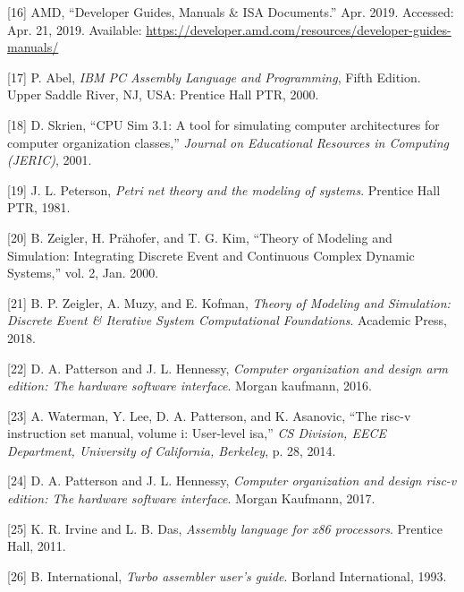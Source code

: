 \documentclass[12pt,twoside]{templates/unerthesis}
\newenvironment{cslreferences}%
  {}%
  {\par}
\begin{document}
\begin{cslreferences}
\leavevmode\hypertarget{ref-amd_developer_2019}{}%
{[}16{]} AMD, ``Developer Guides, Manuals \& ISA Documents.'' Apr. 2019. Accessed: Apr. 21, 2019. Available: \url{https://developer.amd.com/resources/developer-guides-manuals/}

\leavevmode\hypertarget{ref-abel_ibm_2000}{}%
{[}17{]} P. Abel, \emph{IBM PC Assembly Language and Programming}, Fifth Edition. Upper Saddle River, NJ, USA: Prentice Hall PTR, 2000.

\leavevmode\hypertarget{ref-skrien_cpu_2001}{}%
{[}18{]} D. Skrien, ``CPU Sim 3.1: A tool for simulating computer architectures for computer organization classes,'' \emph{Journal on Educational Resources in Computing (JERIC)}, 2001.

\leavevmode\hypertarget{ref-peterson_petri_1981}{}%
{[}19{]} J. L. Peterson, \emph{Petri net theory and the modeling of systems}. Prentice Hall PTR, 1981.

\leavevmode\hypertarget{ref-zeigler_theory_2000}{}%
{[}20{]} B. Zeigler, H. Prähofer, and T. G. Kim, ``Theory of Modeling and Simulation: Integrating Discrete Event and Continuous Complex Dynamic Systems,'' vol. 2, Jan. 2000.

\leavevmode\hypertarget{ref-zeigler_theory_2018}{}%
{[}21{]} B. P. Zeigler, A. Muzy, and E. Kofman, \emph{Theory of Modeling and Simulation: Discrete Event \& Iterative System Computational Foundations}. Academic Press, 2018.

\leavevmode\hypertarget{ref-patterson2016computer}{}%
{[}22{]} D. A. Patterson and J. L. Hennessy, \emph{Computer organization and design arm edition: The hardware software interface}. Morgan kaufmann, 2016.

\leavevmode\hypertarget{ref-waterman2014risc}{}%
{[}23{]} A. Waterman, Y. Lee, D. A. Patterson, and K. Asanovic, ``The risc-v instruction set manual, volume i: User-level isa,'' \emph{CS Division, EECE Department, University of California, Berkeley}, p. 28, 2014.

\leavevmode\hypertarget{ref-patterson_computer_2017}{}%
{[}24{]} D. A. Patterson and J. L. Hennessy, \emph{Computer organization and design risc-v edition: The hardware software interface}. Morgan Kaufmann, 2017.

\leavevmode\hypertarget{ref-irvine2011assembly}{}%
{[}25{]} K. R. Irvine and L. B. Das, \emph{Assembly language for x86 processors}. Prentice Hall, 2011.

\leavevmode\hypertarget{ref-tasm}{}%
{[}26{]} B. International, \emph{Turbo assembler user's guide}. Borland International, 1993.


\end{cslreferences}
\end{document}
